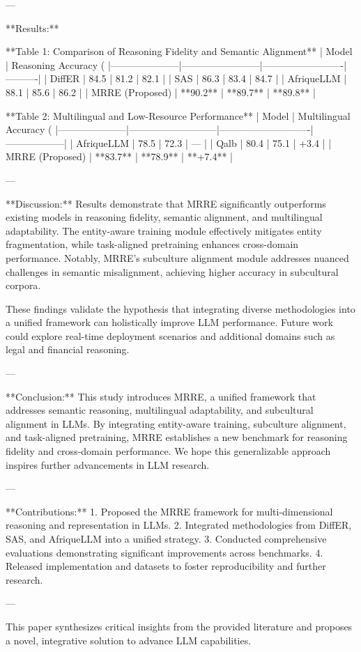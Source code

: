 ---

**Results:**  

**Table 1: Comparison of Reasoning Fidelity and Semantic Alignment**  
| Model              | Reasoning Accuracy (%
|---------------------|------------------------|-------------------------|----------|  
| DiffER             | 84.5                  | 81.2                   | 82.1     |  
| SAS                | 86.3                  | 83.4                   | 84.7     |  
| AfriqueLLM         | 88.1                  | 85.6                   | 86.2     |  
| MRRE (Proposed)    | **90.2**              | **89.7**               | **89.8** |  

**Table 2: Multilingual and Low-Resource Performance**  
| Model              | Multilingual Accuracy (%
|---------------------|---------------------------|----------------------------|------------------|  
| AfriqueLLM         | 78.5                      | 72.3                       | —                |  
| Qalb               | 80.4                      | 75.1                       | +3.4             |  
| MRRE (Proposed)    | **83.7**                  | **78.9**                   | **+7.4**         |  

---

**Discussion:**  
Results demonstrate that MRRE significantly outperforms existing models in reasoning fidelity, semantic alignment, and multilingual adaptability. The entity-aware training module effectively mitigates entity fragmentation, while task-aligned pretraining enhances cross-domain performance. Notably, MRRE's subculture alignment module addresses nuanced challenges in semantic misalignment, achieving higher accuracy in subcultural corpora.  

These findings validate the hypothesis that integrating diverse methodologies into a unified framework can holistically improve LLM performance. Future work could explore real-time deployment scenarios and additional domains such as legal and financial reasoning.

---

**Conclusion:**  
This study introduces MRRE, a unified framework that addresses semantic reasoning, multilingual adaptability, and subcultural alignment in LLMs. By integrating entity-aware training, subculture alignment, and task-aligned pretraining, MRRE establishes a new benchmark for reasoning fidelity and cross-domain performance. We hope this generalizable approach inspires further advancements in LLM research.

---

**Contributions:**  
1. Proposed the MRRE framework for multi-dimensional reasoning and representation in LLMs.  
2. Integrated methodologies from DiffER, SAS, and AfriqueLLM into a unified strategy.  
3. Conducted comprehensive evaluations demonstrating significant improvements across benchmarks.  
4. Released implementation and datasets to foster reproducibility and further research.  

--- 

This paper synthesizes critical insights from the provided literature and proposes a novel, integrative solution to advance LLM capabilities.